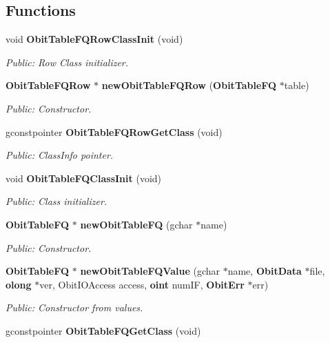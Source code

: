 \subsection*{Functions}
\begin{CompactItemize}
\item 
void {\bf Obit\-Table\-FQRow\-Class\-Init} (void)
\begin{CompactList}\small\item\em Public: Row Class initializer. \item\end{CompactList}\item 
{\bf Obit\-Table\-FQRow} $\ast$ {\bf new\-Obit\-Table\-FQRow} ({\bf Obit\-Table\-FQ} $\ast$table)
\begin{CompactList}\small\item\em Public: Constructor. \item\end{CompactList}\item 
gconstpointer {\bf Obit\-Table\-FQRow\-Get\-Class} (void)
\begin{CompactList}\small\item\em Public: Class\-Info pointer. \item\end{CompactList}\item 
void {\bf Obit\-Table\-FQClass\-Init} (void)
\begin{CompactList}\small\item\em Public: Class initializer. \item\end{CompactList}\item 
{\bf Obit\-Table\-FQ} $\ast$ {\bf new\-Obit\-Table\-FQ} (gchar $\ast$name)
\begin{CompactList}\small\item\em Public: Constructor. \item\end{CompactList}\item 
{\bf Obit\-Table\-FQ} $\ast$ {\bf new\-Obit\-Table\-FQValue} (gchar $\ast$name, {\bf Obit\-Data} $\ast$file, {\bf olong} $\ast$ver, Obit\-IOAccess access, {\bf oint} num\-IF, {\bf Obit\-Err} $\ast$err)
\begin{CompactList}\small\item\em Public: Constructor from values. \item\end{CompactList}\item 
gconstpointer {\bf Obit\-Table\-FQGet\-Class} (void)

\end{CompactItemize}
